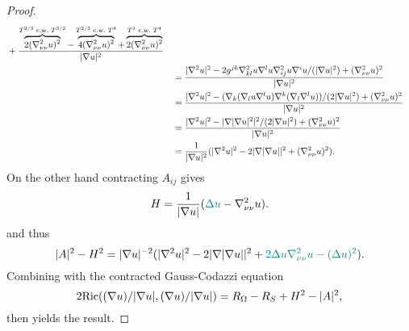 \documentclass[draft]{amsart}
\newcommand*{\mathcomma}{,}
\newcommand*{\mathfullstop}{.}
\newcommand*{\laplacian}{\Delta}
\DeclarePairedDelimiter{\abs}{\lvert}{\rvert} %
\newcommand{\Ricci}{\mathrm{Ric}} %
\begin{document}
\begin{proof}
\begin{equation*}
\begin{aligned}[t]
\begin{aligned}[t]
            &+\frac{\overbrace{2(\nabla^2_{\nu\nu}u)^2}^{T^{2/3}\cw T^{3/2}}-\overbrace{4(\nabla^2_{\nu\nu}u)^2}^{T^{2/3}\cw T^{4}}+\overbrace{2(\nabla^2_{\nu\nu}u)^2}^{T^{1}\cw T^{4}}}{\abs{\nabla u}^2}
            \end{aligned}\\
            &=\frac{\abs{\nabla^2 u}^2-2g^{jk}\nabla^2_{kl}u\nabla^l u\nabla^2_{ij}u \nabla^i{u}/(\abs{\nabla u}^2)+(\nabla^2_{\nu\nu}u)^2}{\abs{\nabla u}^2}\\
            &=\frac{\abs{\nabla^2 u}^2-(\nabla_k(\nabla_l u \nabla^l u)\nabla^k(\nabla_l \nabla^l u))/(2\abs{\nabla u}^2) +(\nabla^2_{\nu\nu}u)^2}{\abs{\nabla u}^2}\\
            &=\frac{\abs{\nabla^2 u}^2-\abs{\nabla\abs{\nabla u}^2}^2/(2\abs{\nabla u}^2)+(\nabla^2_{\nu\nu}u)^2}{\abs{\nabla u}^2}\\
            &=\frac{1}{\abs{\nabla u}^2}(\abs{\nabla^2 u}^2-2\abs{\nabla \abs{\nabla u}}^2+(\nabla^2_{\nu\nu}u)^2)\mathfullstop
        \end{aligned}
    \end{equation*}
    On the other hand contracting \( A_{ij} \) gives
    \begin{equation*}
        H=\frac{1}{\abs{\nabla u}}(\nonHarmonic{\laplacian u}
        -\nabla^2_{\nu \nu} u)\mathfullstop
    \end{equation*}
    and thus
    \begin{equation*}
        \abs{A}^2-H^2=\abs{\nabla u}^{-2}(\abs{\nabla^2 u}^2-2\abs{\nabla\abs{\nabla u}}^2+\nonHarmonic{2\laplacian u \nabla^2_{\nu\nu}u-(\laplacian u)^2})\mathfullstop
    \end{equation*}
    Combining with the contracted Gauss-Codazzi equation
    \begin{equation*}
        2\Ricci((\nabla u)/\abs{\nabla u},(\nabla u)/\abs{\nabla u})=R_\Omega-R_S+H^2-\abs{A}^2\mathcomma
    \end{equation*} 
    then yields the result.
\end{proof}
\end{document}
